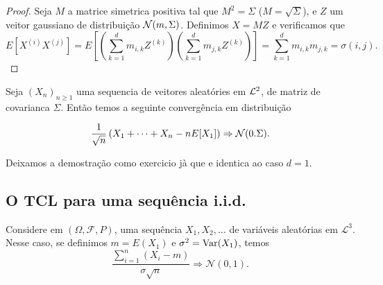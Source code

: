 \begin{proof}
 Seja $M$ a matrice simetrica positiva tal que $M^2=\Sigma$ ($M=\sqrt{\Sigma}$), e $Z$ um veitor gaussiano de distribuição ${\mathcal N}(m,\Sigma)$.
 Definimos $X=MZ$ e verificamos que 
 \begin{equation}
 E[X^{(i)}X^{(j)}]=E[ \left(\sum_{k=1}^d m_{i,k} Z^{(k)}\right)\left(\sum_{k=1}^d m_{j,k} Z^{(k)}\right)]= \sum_{k=1}^d m_{i,k}m_{j,k}= \sigma(i,j).
\end{equation} 
 \end{proof}


\begin{theorem}
 Seja $(X_n)_{n\ge 1}$ uma sequencia de veitores aleatóries em ${\mathcal L}^2$, de matriz de covarianca $\Sigma$.
 Então temos a seguinte convergência em distribuição 
 
 \begin{equation}
  \frac{1}{\sqrt{n}}\left(X_1+\dots+X_n-n E[X_1]\right) \Rightarrow {\ensuremath{\mathcal N}}(0.\Sigma).
 \end{equation}

\end{theorem}

Deixamos a demostração como exercicio jà que e identica ao caso $d=1$.



\newpage

\subsection{O TCL para uma sequência i.i.d.}

\begin{theorem}
  \label{t:tcl_iid}
  Considere em $(\Omega, \mathcal{F}, P)$, uma sequência $X_1, X_2, \dots$ de variáveis aleatórias \iid em $\mathcal{L}^3$.
  Nesse caso, se definimos $m = E(X_1)$ e $\sigma^2 = \operatorname{Var}(X_1)$, temos
  \begin{equation}
    \frac{\sum_{i=1}^n (X_i - m)}{\sigma \sqrt{n}} \Rightarrow \mathcal{N}(0,1).
  \end{equation}
\end{theorem}

